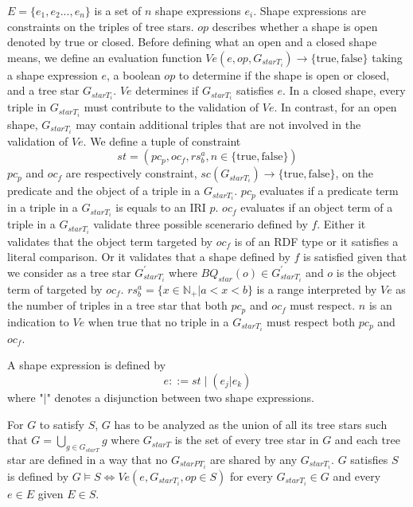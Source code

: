 $E = \{e_1, e_2 ..., e_{n}\}$ is a set of $n$ shape expressions $e_i$.
Shape expressions are constraints on the triples of tree stars.
$op$ describes whether a shape is open denoted by $\mathrm{true}$ or closed.
Before defining what an open and a closed shape means, we define an evaluation function 
$Ve(e, op, G_{starT_i}) \rightarrow \{\mathrm{true}, \mathrm{false} \}$
taking a shape expression $e$, a boolean $op$ to determine if the shape is open or closed, and a tree star $G_{starT_i}$.
$Ve$ determines if $G_{starT_i}$ satisfies $e$.
In a closed shape, every triple in $G_{starT_i}$ must contribute to the validation of $Ve$.
In contrast, for an open shape, $G_{starT_i}$ may contain additional triples that are not involved in the validation of $Ve$.
We define a tuple of constraint
\begin{equation}
    st = (pc_p, oc_f, rs^a_b, n \in \{\mathrm{true}, \mathrm{false}\})
\end{equation}
$pc_p$ and $oc_f$ are respectively constraint,
$sc(G_{starT_i})  \rightarrow \{\mathrm{true}, \mathrm{false}\}$,
on the predicate and the object of a triple in a $G_{starT_i}$.
$pc_p$ evaluates if a predicate term in a triple in a $G_{starT_i}$ is equals to an IRI $p$.
$oc_f$ evaluates if an object term of a triple in a $G_{starT_i}$ validate three possible scenerario defined by $f$.
Either it validates that the object term targeted by $oc_f$ is of an RDF type or it satisfies a literal comparison.
Or it validates that a shape defined by $f$ is satisfied given that we consider as a tree star 
$G_{starT_i}^{\prime}$ where $BQ_{star}(o) \in G_{starT_i}^{\prime}$ and $o$ is the object term of targeted by $oc_f$.
$rs^a_b = \{x \in \mathbb{N}_+ | a < x < b \}$ is a range interpreted by $Ve$ as the number of triples in a tree star that both $pc_p$ and $oc_f$ must respect.
$n$ is an indication to $Ve$ when $\mathrm{true}$ that no triple in a $G_{starT_i}$ must respect both $pc_p$ and $oc_f$. 

A shape expression is defined by
\begin{equation}
 e ::= st \mid (e_j|e_k)
\end{equation}
where "$|$" denotes a disjunction between two shape expressions. 

For $G$ to satisfy $S$, $G$ has to be analyzed as the union of all its tree stars such that $G = \bigcup_{g \in G_{starT}} g$ where $G_{starT}$ is the set of every tree star in $G$
and each tree star are defined in a way that no $G_{starPT_i}$ are shared by any $G_{starT_i}$.
$G$ satisfies $S$ is defined by $G \models S \iff Ve(e,G_{starT_i}, op\in S)$  for every $G_{starT_i} \in G$ and every $e \in E$ given $E \in S$.

